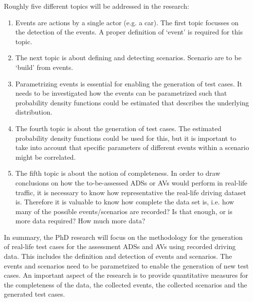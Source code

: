 \documentclass[10pt,final,a4paper,oneside,onecolumn]{article}
\begin{document}
Roughly five different topics will be addressed in the research:
\begin{enumerate}
	\item Events are actions by a single actor (e.g. a car). The first topic focusses on the detection of the events. A proper definition of `event' is required for this topic.
	\item The next topic is about defining and detecting scenarios. Scenario are to be `build' from events. 
	\item Parametrizing events is essential for enabling the generation of test cases. It needs to be investigated how the events can be parametrized such that probability density functions could be estimated that describes the underlying distribution.
	\item The fourth topic is about the generation of test cases. The estimated probability density functions could be used for this, but it is important to take into account that specific parameters of different events within a scenario might be correlated.
	\item The fifth topic is about the notion of completeness. In order to draw conclusions on how the to-be-assessed ADSs or AVs would perform in real-life traffic, it is necessary to know how representative the real-life driving dataset is. Therefore it is valuable to know how complete the data set is, i.e. how many of the possible events/scenarios are recorded? Is that enough, or is more data required? How much more data?
\end{enumerate}

In summary, the PhD research will focus on the methodology for the generation of real-life test cases for the assessment ADSs and AVs using recorded driving data. This includes the definition and detection of events and scenarios. The events and scenarios need to be parametrized to enable the generation of new test cases. An important aspect of the research is to provide quantitative measures for the completeness of the data, the collected events, the collected scenarios and the generated test cases.

%
%
\end{document}
